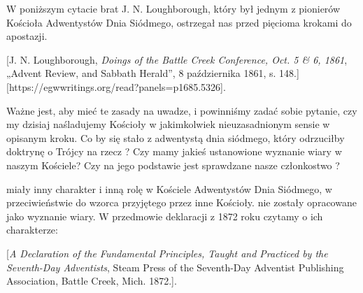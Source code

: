 
W poniższym cytacie brat J. N. Loughborough, który był jednym z pionierów Kościoła Adwentystów Dnia Siódmego, ostrzegał nas przed pięcioma krokami do apostazji.

[J. N. Loughborough, \textit{Doings of the Battle Creek Conference, Oct. 5 \& 6, 1861}, „Advent Review, and Sabbath Herald”, 8 października 1861, s. 148.][https://egwwritings.org/read?panels=p1685.5326].

Ważne jest, aby mieć te zasady na uwadze, i powinniśmy zadać sobie pytanie, czy my dzisiaj naśladujemy Kościoły w jakimkolwiek nieuzasadnionym sensie w opisanym kroku. Co by się stało z adwentystą dnia siódmego, który odrzuciłby doktrynę o Trójcy na rzecz ? Czy mamy jakieś ustanowione wyznanie wiary w naszym Kościele? Czy na jego podstawie jest sprawdzane nasze członkostwo ?

 miały inny charakter i inną rolę w Kościele Adwentystów Dnia Siódmego, w przeciwieństwie do wzorca przyjętego przez inne Kościoły.  nie zostały opracowane jako wyznanie wiary. W przedmowie deklaracji z 1872 roku czytamy o ich charakterze:

[\textit{A Declaration of the Fundamental Principles, Taught and Practiced by the Seventh-Day Adventists}, Steam Press of the Seventh-Day Adventist Publishing Association, Battle Creek, Mich. 1872.].

